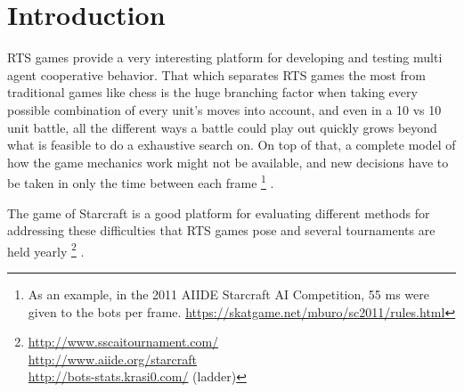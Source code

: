\section{Introduction}
RTS games provide a very interesting platform for developing and testing multi agent cooperative behavior.
That which separates RTS games the most from traditional games like chess is the huge branching factor when taking every possible combination of every unit's moves into account, and even in a 10 vs 10 unit battle, all the different ways a battle could play out quickly grows beyond what is feasible to do a exhaustive search on.
On top of that, a complete model of how the game mechanics work might not be available, and new decisions have to be taken in only the time between each frame
\footnote{
As an example, in the 2011 AIIDE Starcraft AI Competition, 55 ms were given to the bots per frame.
\url{https://skatgame.net/mburo/sc2011/rules.html}
}
.

The game of Starcraft is a good platform for evaluating different methods for addressing these difficulties that RTS games pose and several tournaments are held yearly
\footnote{
\url{http://www.sscaitournament.com/} \\
\url{http://www.aiide.org/starcraft} \\
\url{http://bots-stats.krasi0.com/} (ladder)
}
.
